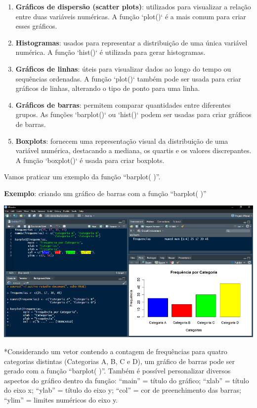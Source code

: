 \documentclass[
]{book}
\begin{document}
\begin{enumerate}
\def\labelenumi{\arabic{enumi}.}
\item
  \textbf{Gráficos de dispersão (scatter plots)}: utilizados para visualizar a relação entre duas variáveis numéricas. A função `plot()` é a mais comum para criar esses gráficos.
\item
  \textbf{Histogramas}: usados para representar a distribuição de uma única variável numérica. A função `hist()` é utilizada para gerar histogramas.
\item
  \textbf{Gráficos de linhas}: úteis para visualizar dados ao longo do tempo ou sequências ordenadas. A função `plot()` também pode ser usada para criar gráficos de linhas, alterando o tipo de ponto para uma linha.
\item
  \textbf{Gráficos de barras}: permitem comparar quantidades entre diferentes grupos. As funções `barplot()` ou `hist()` podem ser usadas para criar gráficos de barras.
\item
  \textbf{Boxplots}: fornecem uma representação visual da distribuição de uma variável numérica, destacando a mediana, os quartis e os valores discrepantes. A função `boxplot()` é usada para criar boxplots.
\end{enumerate}

Vamos praticar um exemplo da função ``barplot( )''.

\textbf{Exemplo}: criando um gráfico de barras com a função ``barplot( )''

\includegraphics{images/clipboard-18805364.png}

*Considerando um vetor contendo a contagem de frequências para quatro categorias distintas (Categorias A, B, C e D), um gráfico de barras pode ser gerado com a função ``barplot( )''. Também é possível personalizar diversos aspectos do gráfico dentro da função: ``main'' = título do gráfico; ``xlab'' = título do eixo x; ``ylab'' = título do eixo y; ``col'' = cor de preenchimento das barras; ``ylim'' = limites numéricos do eixo y.
\end{document}
